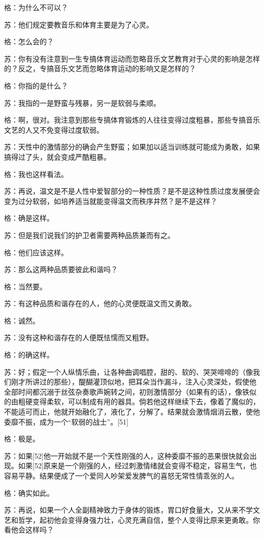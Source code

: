 \documentclass[12pt,oneside]{book}
\begin{document}
格：为什么不可以？

苏：他们规定要教音乐和体育主要是为了心灵。

格：怎么会的？

苏：你有没有注意到一生专搞体育运动而忽略音乐文艺教育对于心灵的影响是怎样的？反之，专搞音乐文艺而忽略体育运动的影响又是怎样的？

格：你指的是什么？

苏：我指的一是野蛮与残暴，另一是软弱与柔顺。

格：啊，很对。我注意到那些专搞体育锻炼的人往往变得过度粗暴，那些专搞音乐文艺的人又不免变得过度软弱。

苏：天性中的激情部分的确会产生野蛮；如果加以适当训练就可能成为勇敢，如果搞得过了头，就会变成严酷粗暴。

格：我也这样看法。

苏：再说，温文是不是人性中爱智部分的一种性质？是不是这种性质过度发展便会变为过分软弱，如培养适当就能变得温文而秩序井然？是不是这样？

格：确是这样。

苏：但是我们说我们的护卫者需要两种品质兼而有之。

格：他们应该这样。

苏：那么这两种品质要彼此和谐吗？

格：当然要。

苏：有这种品质和谐存在的人，他的心灵便既温文而又勇敢。

格：诚然。

苏：没有这种和谐存在的人便既怯懦而又粗野。

格：的确这样。

苏：好；假定一个人纵情乐曲，让各种曲调唱腔，甜的、软的、哭哭啼啼的（像我们刚才所讲过的那些），醍醐灌顶似地，把耳朵当作漏斗，注入心灵深处，假使他全部时间都沉溺于丝弦杂奏歌声婉转之间，初则激情部分（如果有的话），像铁似的由粗硬变得柔软，可以制成有用的器具。倘若他这样继续下去，像着了魔似的，不能适可而止，他就开始融化了，液化了，分解了。结果就会激情烟消云散，使他委靡不振，成为一个“软弱的战士”。[51]

格：极是。

苏：如果[52]他一开始就不是一个天性刚强的人，这种委靡不振的恶果很快就会出现。如果[52]原来是一个刚强的人，经过刺激情绪就会变得不稳定，容易生气，也容易平静。结果便成了一个爱同人吵架爱发脾气的喜怒无常性情乖张的人。

格：确实如此。

苏：再说，如果一个人全副精神致力于身体的锻炼，胃口好食量大，又从来不学文艺和哲学，起初他会变得身强力壮，心灵充满自信，整个人变得比原来更勇敢。你看他会这样吗？
\end{document}
